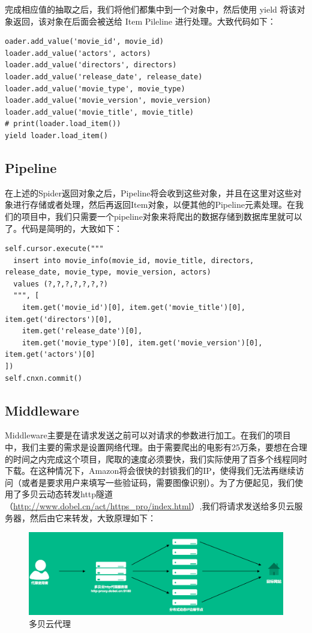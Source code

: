 \documentclass{ctexrep}
\begin{document}
	完成相应值的抽取之后，我们将他们都集中到一个对象中，然后使用 yield 将该对象返回，该对象在后面会被送给 Item Pileline 进行处理。大致代码如下：\begin{lstlisting}
oader.add_value('movie_id', movie_id)
loader.add_value('actors', actors)
loader.add_value('directors', directors)
loader.add_value('release_date', release_date)
loader.add_value('movie_type', movie_type)
loader.add_value('movie_version', movie_version)
loader.add_value('movie_title', movie_title)
# print(loader.load_item())
yield loader.load_item()
	\end{lstlisting}
	\subsection{Pipeline}
	在上述的Spider返回对象之后，Pipeline将会收到这些对象，并且在这里对这些对象进行存储或者处理，然后再返回Item对象，以便其他的Pipeline元素处理。在我们的项目中，我们只需要一个pipeline对象来将爬出的数据存储到数据库里就可以了。代码是简明的，大致如下：\begin{lstlisting}
self.cursor.execute("""
  insert into movie_info(movie_id, movie_title, directors, release_date, movie_type, movie_version, actors)
  values (?,?,?,?,?,?,?)
  """, [
    item.get('movie_id')[0], item.get('movie_title')[0], item.get('directors')[0],
    item.get('release_date')[0],
    item.get('movie_type')[0], item.get('movie_version')[0], item.get('actors')[0]
])
self.cnxn.commit()
	\end{lstlisting}
	\subsection{Middleware}
	Middleware主要是在请求发送之前可以对请求的参数进行加工。在我们的项目中，我们主要的需求是设置网络代理。由于需要爬出的电影有25万条，要想在合理的时间之内完成这个项目，爬取的速度必须要快，我们实际使用了百多个线程同时下载。在这种情况下，Amazon将会很快的封锁我们的IP，使得我们无法再继续访问（或者是要求用户来填写一些验证码，需要图像识别）。为了方便起见，我们使用了多贝云动态转发http隧道（\url{http://www.dobel.cn/act/https_pro/index.html}）,我们将请求发送给多贝云服务器，然后由它来转发，大致原理如下：\begin{figure}[H]
		\centering
		\includegraphics[width=0.7\linewidth]{img/product_desc}
		\caption{多贝云代理}
		\label{fig:productdesc}
	\end{figure}
	
\end{document}
